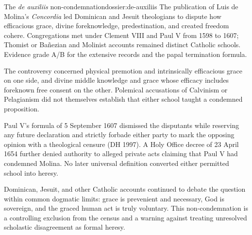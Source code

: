 \begin{heresydossier}{The \emph{de auxiliis} non-condemnation}{dossier:de-auxiliis}
\objectfield The publication of Luis de Molina's \emph{Concordia} led Dominican and Jesuit theologians to dispute how efficacious grace, divine foreknowledge, predestination, and created freedom cohere. Congregations met under Clement VIII and Paul V from 1598 to 1607; Thomist or Ba\~nezian and Molinist accounts remained distinct Catholic schools. Evidence grade A/B for the extensive records and the papal termination formula.

\propositionfield The controversy concerned physical premotion and intrinsically efficacious grace on one side, and divine middle knowledge and grace whose efficacy includes foreknown free consent on the other. Polemical accusations of Calvinism or Pelagianism did not themselves establish that either school taught a condemned proposition.

\responsefield Paul V's formula of 5 September 1607 dismissed the disputants while reserving any future declaration and strictly forbade either party to mark the opposing opinion with a theological censure (DH 1997). A Holy Office decree of 23 April 1654 further denied authority to alleged private acts claiming that Paul V had condemned Molina. No later universal definition converted either permitted school into heresy.

\aftermathfield Dominican, Jesuit, and other Catholic accounts continued to debate the question within common dogmatic limits: grace is prevenient and necessary, God is sovereign, and the graced human act is truly voluntary. This non-condemnation is a controlling exclusion from the census and a warning against treating unresolved scholastic disagreement as formal heresy.
\end{heresydossier}

